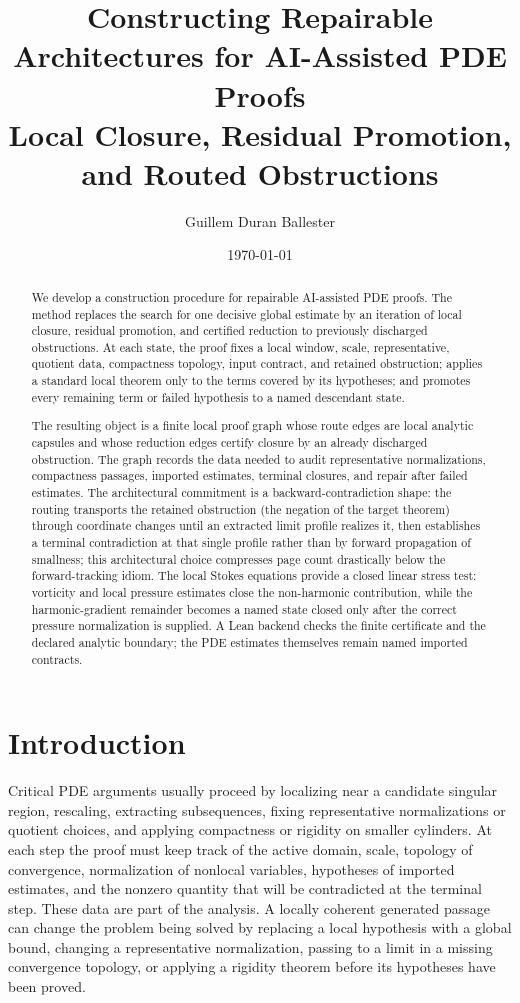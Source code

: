 \documentclass[11pt]{article}
\title{\textbf{Constructing Repairable Architectures for AI-Assisted PDE Proofs}\\
\large Local Closure, Residual Promotion, and Routed Obstructions}
\author{Guillem Duran Ballester}
\date{\today}
\theoremstyle{plain}
\theoremstyle{definition}
\theoremstyle{remark}
\begin{document}
\maketitle

\begin{abstract}
We develop a construction procedure for repairable AI-assisted PDE proofs.  The
method replaces the search for one decisive global estimate by an iteration of
local closure, residual promotion, and certified reduction to previously
discharged obstructions.  At each state, the proof fixes a local window, scale,
representative, quotient data, compactness topology, input contract, and
retained obstruction; applies a standard local theorem only to the terms
covered by its hypotheses; and promotes every remaining term or failed
hypothesis to a named descendant state.

The resulting object is a finite local proof graph whose route edges are local
analytic capsules and whose reduction edges certify closure by an already
discharged obstruction.  The graph records the data needed to audit representative
normalizations, compactness passages, imported estimates, terminal closures,
and repair after failed estimates.  The architectural commitment is a
backward-contradiction shape: the routing transports the retained obstruction
(the negation of the target theorem) through coordinate changes until an
extracted limit profile realizes it, then establishes a terminal contradiction
at that single profile rather than by forward propagation of smallness; this
architectural choice compresses page count drastically below the
forward-tracking idiom.  The local Stokes equations
provide a closed linear stress test: vorticity and local pressure estimates
close the non-harmonic contribution, while the harmonic-gradient remainder
becomes a named state closed only after the correct pressure normalization is
supplied.  A Lean backend checks the finite certificate and the declared
analytic boundary; the PDE estimates themselves remain named imported
contracts.
\end{abstract}

\tableofcontents

\section{Introduction}
\label{sec:introduction}

Critical PDE arguments usually proceed by localizing near a candidate singular
region, rescaling, extracting subsequences, fixing representative normalizations or
quotient choices, and applying compactness or rigidity on smaller
cylinders.  At each step the proof must keep track of the active domain, scale,
topology of convergence, normalization of nonlocal variables, hypotheses of
imported estimates, and the nonzero quantity that will be contradicted at the
terminal step.  These data are part of the analysis.  A locally coherent
generated passage can change the problem being solved by replacing a local
hypothesis with a global bound, changing a representative normalization, passing to a
limit in a missing convergence topology, or applying a rigidity theorem before
its hypotheses have been proved.
\end{document}
